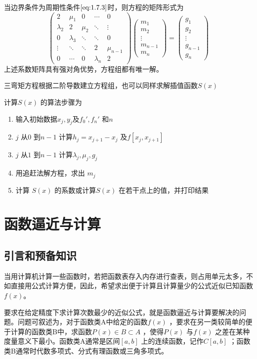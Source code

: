 \documentclass[a4paper]{article}
\begin{document}
当边界条件为周期性条件$\ref{eq:1.7.3}$时，则方程的矩阵形式为
\[
\begin{pmatrix} 
	2 & \mu_1 & 0 & \cdots & 0 \\
	\lambda_2 & 2 & \mu_2 & \ddots & \vdots \\
	0 & \lambda_3 & \ddots & \ddots & 0 \\
	\vdots & \ddots & \ddots & 2 & \mu_{n-1} \\
	0 & \cdots & 0 & \lambda_n & 2
\end{pmatrix} 
\begin{pmatrix} 
	m_1 \\ m_2 \\ \vdots \\ m_{n-1} \\ m_n
\end{pmatrix} = 
\begin{pmatrix} 
	g_1 \\ g_2 \\ \vdots \\ g_{n-1} \\ g_n
\end{pmatrix} 
\] 
上述系数矩阵具有强对角优势，方程组都有唯一解。

三弯矩方程根据二阶导数建立方程组，也可以同样求解插值函数$S(x)$

计算$S(x)$ 的算法步骤为
\begin{enumerate}
	\item 输入初始数据$x_{j},y_{j}$及$f_0',f_n'$ 和$n$
	\item  $j$ 从$0$ 到$n-1$ 计算$h_j = x_{j+1} - x_{j}$ 及$f[x_{j}, x_{j+1}]$
	\item $j$ 从$1$ 到$n-1$ 计算$\lambda_j, \mu_j, g_j$
	\item 用追赶法解方程，求出 $m_j$
	\item 计算 $S(x)$ 的系数或计算$S(x)$ 在若干点上的值，并打印结果
\end{enumerate}
\section{函数逼近与计算}
\subsection{引言和预备知识}
当用计算机计算一些函数时，若把函数表存入内存进行查表，则占用单元太多，不如直接用公式计算方便，因此，希望求出便于计算且计算量少的公式近似已知函数$f(x)$。

要求在给定精度下求计算次数最少的近似公式，就是函数逼近与计算要解决的问题。问题可叙述为，对于函数类A中给定的函数$f(x)$ ，要求在另一类较简单的便于计算的函数类B中，求函数$P(x) \in B \subset A$ ，使得$P(x)$ 与$f(x)$ 之差在某种度量意义下最小。函数类A通常是区间$[a,b]$ 上的连续函数，记作$C[a,b]$ ；函数类B通常时代数多项式、分式有理函数或三角多项式。
\end{document}
